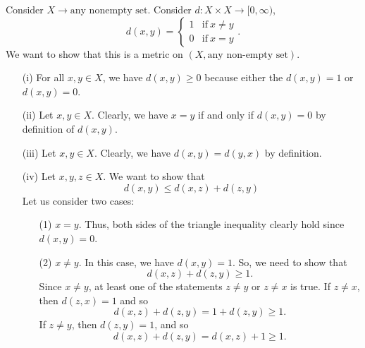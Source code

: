 \documentclass[a4paper]{report}
\begin{document}
\begin{eg}
    Consider \( X \to \text{any nonempty set}  \). Consider \( d: X \times X \to [0,\infty ) \),   
    \[  d(x,y) = 
    \begin{cases}
        1 &\text{if} \  x \neq y  \\
        0 &\text{if} \ x = y
    \end{cases}. \]
    We want to show that this is a metric on \( (X, \text{any non-empty set}) \).
    \begin{enumerate}
        \item[(i)] For all \( x,y \in X  \), we have \( d(x,y) \geq 0  \) because either the \( d(x,y)  = 1  \) or \( d(x,y) = 0  \).
        \item[(ii)] Let \( x,y \in X  \). Clearly, we have \( x = y  \) if and only if \(  d(x,y) = 0 \) by definition of \( d(x,y) \).
        \item[(iii)] Let \( x,y \in X  \). Clearly, we have \( d(x,y) = d(y,x) \) by definition.  
        \item[(iv)] Let \( x,y,z \in X  \). We want to show that 
            \[  d(x,y) \leq d(x,z) + d(z,y) \]
            Let us consider two cases:
            \begin{enumerate}
                \item[(1)] \( x = y \). Thus, both sides of the triangle inequality clearly hold since \( d(x,y) = 0  \).
                \item[(2)] \( x \neq y  \). In this case, we have \( d(x,y) = 1  \). So, we need to show that 
                    \[  d(x,z) + d(z,y) \geq 1. \]
                    Since \( x \neq y  \), at least one of the statements \( z \neq y  \) or \( z \neq x  \) is true. If \( z \neq x  \), then \( d(z,x ) = 1  \) and so 
                    \[  d(x,z) + d(z,y) =  1 + d(z,y) \geq  1.  \]
                    If \( z \neq y  \), then \( d(z,y) = 1  \), and so
                    \[  d(x,z) + d(z,y) = d(x,z) + 1 \geq 1.  \]
            \end{enumerate}
    \end{enumerate}
\end{eg}
\end{document}
